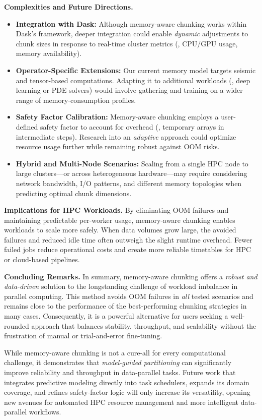 \vspace{6pt}
\noindent
\textbf{Complexities and Future Directions.}
\begin{itemize}
    \item \textbf{Integration with Dask:}
    Although memory-aware chunking works within Dask's framework, deeper integration could enable \emph{dynamic} adjustments to chunk sizes in response to real-time cluster metrics (\eg, CPU/GPU usage, memory availability).
    \item \textbf{Operator-Specific Extensions:}
    Our current memory model targets seismic and tensor-based computations. Adapting it to additional workloads (\eg, deep learning or PDE solvers) would involve gathering and training on a wider range of memory-consumption profiles.
    \item \textbf{Safety Factor Calibration:}
    Memory-aware chunking employs a user-defined safety factor to account for overhead (\eg, temporary arrays in intermediate steps). Research into an \emph{adaptive} approach could optimize resource usage further while remaining robust against \ac{OOM} risks.
    \item \textbf{Hybrid and Multi-Node Scenarios:}
    Scaling from a single \ac{HPC} node to large clusters—or across heterogeneous hardware—may require considering network bandwidth, \ac{I/O} patterns, and different memory topologies when predicting optimal chunk dimensions.
\end{itemize}

\vspace{6pt}
\noindent
\textbf{Implications for \ac{HPC} Workloads.}
By eliminating \ac{OOM} failures and maintaining predictable per-worker usage, memory-aware chunking enables workloads to scale more safely.
When data volumes grow large, the avoided failures and reduced idle time often outweigh the slight runtime overhead.
Fewer failed jobs reduce operational costs and create more reliable timetables for \ac{HPC} or cloud-based pipelines.

\vspace{6pt}
\noindent
\textbf{Concluding Remarks.}
In summary, memory-aware chunking offers a \emph{robust and data-driven} solution to the longstanding challenge of workload imbalance in parallel computing.
This method avoids \ac{OOM} failures in \emph{all} tested scenarios and remains close to the performance of the best-performing chunking strategies in many cases.
Consequently, it is a powerful alternative for users seeking a well-rounded approach that balances stability, throughput, and scalability without the frustration of manual or trial-and-error fine-tuning.

While memory-aware chunking is not a cure-all for every computational challenge, it demonstrates that \emph{model-guided partitioning} can significantly improve reliability and throughput in data-parallel tasks.
Future work that integrates predictive modeling directly into task schedulers, expands its domain coverage, and refines safety-factor logic will only increase its versatility, opening new avenues for automated \ac{HPC} resource management and more intelligent data-parallel workflows.